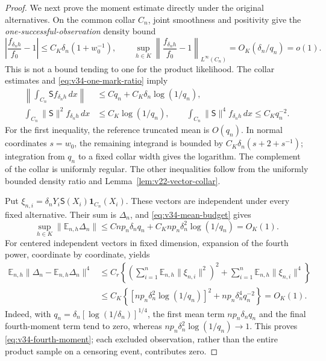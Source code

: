 \begin{proof}
We next prove the moment estimate directly under the original alternatives.
On the common collar \(C_n\), joint smoothness and positivity give the
\emph{one-successful-observation} density bound
\begin{equation}\label{eq:v34-one-mark-ratio}
 \left|\frac{f_{\delta_nh}}{f_0}-1\right|
       \le C_K\delta_n(1+w_0^{-1}),\qquad
 \sup_{h\in K}\left\|\frac{f_{\delta_nh}}{f_0}-1\right\|_{L^\infty(C_n)}
       =O_K(\delta_n/q_n)=o(1).
\end{equation}
This is not a bound tending to one for the product likelihood.
The collar estimates and \eqref{eq:v34-one-mark-ratio} imply
\begin{align}
 \left\|\int_{C_n}\mathsf S f_{\delta_nh}\,dx\right\|
       &\le Cq_n+C_K\delta_n\log(1/q_n),
                                      \label{eq:v34-mean-budget}\\
 \int_{C_n}\|\mathsf S\|^2 f_{\delta_nh}\,dx
       &\le C_K\log(1/q_n),\qquad
 \int_{C_n}\|\mathsf S\|^4 f_{\delta_nh}\,dx\le C_Kq_n^{-2}.
                                      \label{eq:v34-moment-budget}
\end{align}
For the first inequality, the reference truncated mean is \(O(q_n)\).
In normal coordinates \(s=w_0\), the remaining integrand is bounded by
\(C_K\delta_n(s+2+s^{-1})\); integration from \(q_n\) to a fixed collar
width gives the logarithm.  The complement of the collar is uniformly
regular.  The other inequalities follow from the uniformly bounded density
ratio and Lemma~\ref{lem:v22-vector-collar}.

Put \(\xi_{n,i}=\delta_nY_i\mathsf S(X_i)\mathbf1_{C_n}(X_i)\).
These vectors are independent under every fixed alternative.  Their sum is
\(\Delta_n\), and \eqref{eq:v34-mean-budget} gives
\[
 \sup_{h\in K}\|\mathbb E_{n,h}\Delta_n\|
 \le Cnp_n\delta_nq_n+C_Knp_n\delta_n^2\log(1/q_n)=O_K(1).
\]
For centered independent vectors in fixed dimension, expansion of the fourth
power, coordinate by coordinate, yields
\begin{align*}
 \mathbb E_{n,h}\|\Delta_n-\mathbb E_{n,h}\Delta_n\|^4
 &\le C_r\left\{
       \left(\sum_{i=1}^n\mathbb E_{n,h}\|\xi_{n,i}\|^2\right)^2
              +\sum_{i=1}^n\mathbb E_{n,h}\|\xi_{n,i}\|^4\right\}\\
 &\le C_K\left\{
     [np_n\delta_n^2\log(1/q_n)]^2+np_n\delta_n^4q_n^{-2}\right\}
 =O_K(1).
\end{align*}
Indeed, with \(q_n=\delta_n[\log(1/\delta_n)]^{1/4}\), the first mean
term \(np_n\delta_nq_n\) and the final fourth-moment term tend to zero,
whereas \(np_n\delta_n^2\log(1/q_n)\to1\).
This proves \eqref{eq:v34-fourth-moment}; each excluded observation, rather
than the entire product sample on a censoring event, contributes zero.


\end{proof}
